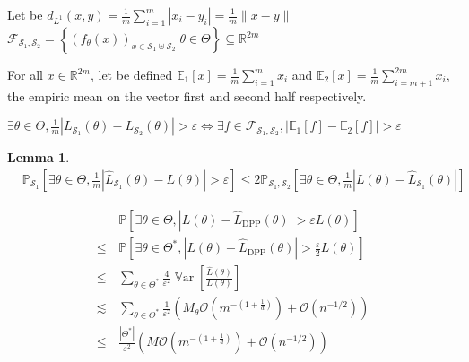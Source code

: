 \documentclass{article} %
\renewcommand{\epsilon}{\varepsilon}
\newcommand{\RR}{\mathbb{R}}
\newcommand{\PP}{\mathbb{P}}
\newcommand{\EE}{\mathbb{E}}
\newcommand{\OO}{\mathcal{O}}
\newcommand{\Var}{\operatorname{\mathbb V ar}}
\newcommand{\1}{\mathds{1}} %
\newtheorem{lemma}{Lemma}
\theoremstyle{definition} %
\begin{document}
\vspace{5cm}


Let be $d_{L^1}(x ,y) = \frac 1 m \sum_{i=1}^m |x_i - y_i| = \frac{1}{m} \lVert x- y \rVert$
$\mathcal{F}_{\mathcal{S}_1, \mathcal{S}_2} = \left\{(f_\theta(x))_{x\in \mathcal{S}_1 \uplus \mathcal{S}_2} | \theta \in \Theta \right\} \subseteq \RR^{2m}$	

For all $x \in \RR^{2m}$, let be defined $\EE_1[x] = \frac{1}{m} \sum_{i=1}^{m} x_i$ and $\EE_2[x] = \frac{1}{m} \sum_{i=m+1}^{2m} x_i$, the empiric mean on the vector first and second half respectively.

$\exists \theta \in \Theta,  \frac 1 m | L_{\mathcal{S}_1}(\theta)- L_{\mathcal{S}_2}(\theta)|>\epsilon \iff \exists f \in \mathcal{F}_{\mathcal{S}_1, \mathcal{S}_2}, |\EE_1[f] - \EE_2[f]| > \epsilon$
\begin{lemma}
	\begin{align*}
		&\PP_{\mathcal{S}_1} \left[ \exists \theta \in \Theta,  \frac 1 m |\hat L_{\mathcal{S}_1}(\theta)- L(\theta)|>\epsilon \right] \leq
		2 \PP_{\mathcal{S}_1, \mathcal{S}_2} \left[ \exists \theta \in \Theta,  \frac 1 m |L(\theta)-\hat L_{\mathcal{S}_1}(\theta)|\right] 
	\end{align*}
\end{lemma}

\begin{align*}
	&\PP \left[ \exists \theta \in \Theta,  |L(\theta)-\hat L_{\textrm{DPP}}(\theta)|>\epsilon L(\theta)\right] \\
	\leq \,&\PP \left[ \exists \theta \in \Theta^*,  |L(\theta)-\hat L_{\textrm{DPP}}(\theta)|>\frac{\epsilon}{2} L(\theta)\right] \\
	\leq &\sum_{\theta \in \Theta^*} \frac{4}{\epsilon^2} \Var[\frac{\hat L(\theta)}{L(\theta)}] \\
	\lesssim &\sum_{\theta \in \Theta^*} \frac{1}{\epsilon^2}( M_\theta \OO(m^{-(1+\frac 1 d)}) + \OO(n^{-1/2})) \\
	\leq &\frac{|\Theta^*|}{\epsilon^2} (M \OO(m^{-(1+\frac 1 d)}) + \OO(n^{-1/2}))
\end{align*}
\end{document}
